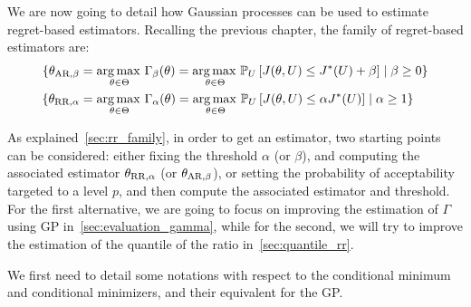 \documentclass[../../Main_ManuscritThese.tex]{subfiles}
\begin{document}
We are now going to detail how Gaussian processes can be used to estimate regret-based estimators.
Recalling the previous chapter, the family of regret-based estimators are:
\begin{align}
  \{ {\theta}_{\mathrm{AR,\beta}} &= \operatorname*{arg\,max \,}_{\theta\in\Theta} \Gamma_\beta(\theta) = \operatorname*{arg\,max \,}_{\theta\in\Theta} \mathbb{P}_{U}\left[J(\theta, U) \leq J^*(U) + \beta \right] \mid \beta \geq 0 \} \\
\{ {\theta}_{\mathrm{RR,\alpha}} &= \operatorname*{arg\,max \,}_{\theta\in\Theta} \Gamma_\alpha(\theta) = \operatorname*{arg\,max \,}_{\theta\in\Theta}\mathbb{P}_{U}\left[J(\theta, U) \leq \alpha J^*(U)\right] \mid \alpha \geq 1 \}
\end{align}

As explained~\cref{sec:rr_family}, in order to get an estimator, two starting points can be considered: either fixing the threshold $\alpha$ (or $\beta$), and computing the associated estimator ${\theta}_{\mathrm{RR,\alpha}}$ (or ${\theta}_{\mathrm{AR,\beta}}$), or setting the probability of acceptability targeted to a level $p$, and then compute the associated estimator and threshold. For the first alternative, we are going to focus on improving the estimation of $\Gamma$ using GP in~\cref{sec:evaluation_gamma}, while for the second, we will try to improve the estimation of the quantile of the ratio in~\cref{sec:quantile_rr}.


We first need to detail some notations with respect to the conditional minimum and conditional minimizers, and their equivalent for the GP.
\end{document}
